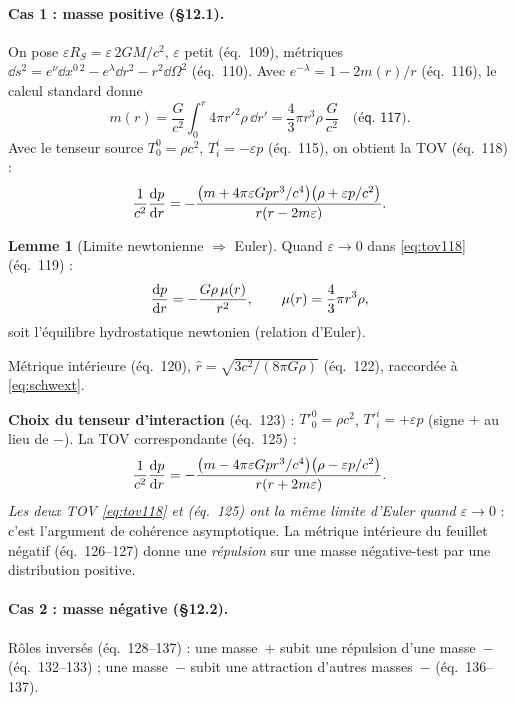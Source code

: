 \documentclass[11pt,a4paper]{article}
\theoremstyle{definition}
\newtheorem{lemme}{Lemme}[section]
\theoremstyle{plain}
\newcommand{\eqpaper}[1]{\textsf{(éq.~#1)}}   %
\begin{document}
\paragraph{Cas 1 : masse positive (\S12.1).}
On pose $\varepsilon R_S=\varepsilon\,2GM/c^2$, $\varepsilon$ petit \eqpaper{109}, métriques
$\dd s^2=e^\nu\dd x^{0\,2}-e^\lambda\dd r^2-r^2\dd\Omega^2$ \eqpaper{110}. Avec
$e^{-\lambda}=1-2m(r)/r$ \eqpaper{116}, le calcul standard \cite[éq.~14.18]{Adler1975} donne
\begin{equation}
m(r)=\frac{G}{c^2}\int_0^r 4\pi r'^2\rho\,\dd r'=\frac{4}{3}\pi r^3\rho\,\frac{G}{c^2}
\quad\eqpaper{117}.
\end{equation}
Avec le tenseur source $T^0_0=\rho c^2$, $T^i_i=-\varepsilon p$ \eqpaper{115}, on obtient la
TOV \eqpaper{118} :
\begin{equation}
\frac{1}{c^2}\dv{p}{r}
=-\frac{\bigl(m+4\pi\varepsilon Gpr^3/c^4\bigr)\bigl(\rho+\varepsilon p/c^2\bigr)}{r(r-2m\varepsilon)}.
\label{eq:tov118}
\end{equation}

\begin{lemme}[Limite newtonienne $\Rightarrow$ Euler]
Quand $\varepsilon\to0$ dans \eqref{eq:tov118} \eqpaper{119} :
\begin{equation}
\dv{p}{r}=-\frac{G\rho\,\mu(r)}{r^2},\qquad \mu(r)=\frac{4}{3}\pi r^3\rho,
\end{equation}
soit l'équilibre hydrostatique newtonien (relation d'Euler).
\end{lemme}

Métrique intérieure \eqpaper{120}, $\hat r=\sqrt{3c^2/(8\pi G\rho)}$ \eqpaper{122}, raccordée à
\eqref{eq:schwext}.

\textbf{Choix du tenseur d'interaction} \eqpaper{123} : $T'^0_0=\rho c^2$, $T'^i_i=+\varepsilon p$
(signe $+$ au lieu de $-$). La TOV correspondante \eqpaper{125} :
\begin{equation}
\frac{1}{c^2}\dv{p}{r}
=-\frac{\bigl(m-4\pi\varepsilon Gpr^3/c^4\bigr)\bigl(\rho-\varepsilon p/c^2\bigr)}{r(r+2m\varepsilon)}.
\end{equation}
\emph{Les deux TOV \eqref{eq:tov118} et \eqpaper{125} ont la même limite d'Euler quand
$\varepsilon\to0$} : c'est l'argument de cohérence asymptotique. La métrique intérieure du
feuillet négatif \eqpaper{126--127} donne une \emph{répulsion} sur une masse négative-test par
une distribution positive.

\paragraph{Cas 2 : masse négative (\S12.2).}
Rôles inversés \eqpaper{128--137} : une masse~$+$ subit une répulsion d'une masse~$-$
\eqpaper{132--133} ; une masse~$-$ subit une attraction d'autres masses~$-$ \eqpaper{136--137}.
\end{document}
